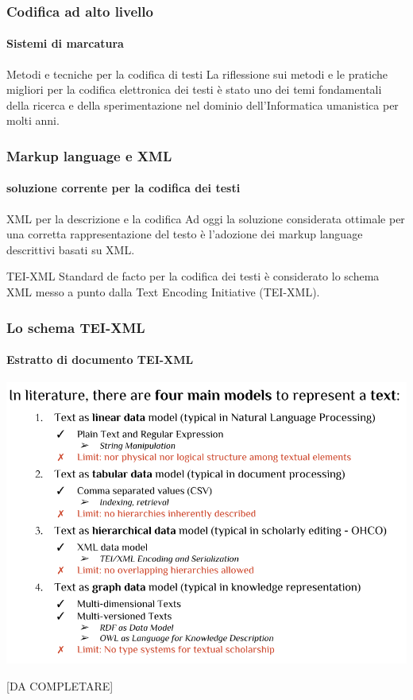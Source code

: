 \begin{frame}
	\frametitle{Codifica ad alto livello}
	\framesubtitle{Sistemi di marcatura}
	\addtocounter{nframe}{1}

	\begin{block}{Metodi e tecniche per la codifica di testi}
		La riflessione sui metodi e le pratiche migliori per la codifica elettronica dei testi è stato uno dei temi fondamentali della ricerca e della sperimentazione nel dominio dell’Informatica umanistica per molti anni.
	\end{block}

\end{frame}

\begin{frame}
	\frametitle{Markup language e XML}
	\framesubtitle{soluzione corrente per la codifica dei testi}
	\addtocounter{nframe}{1}

	\begin{block}{XML per la descrizione e la codifica}
		Ad oggi la soluzione considerata ottimale per una corretta rappresentazione del testo è l'adozione dei markup language descrittivi basati su XML.
	\end{block}

	\begin{block}{TEI-XML}
		Standard de facto per la codifica dei testi è considerato lo schema XML messo a punto dalla Text Encoding Initiative (TEI-XML).
	\end{block}

\end{frame}

\begin{frame}
	\frametitle{Lo schema TEI-XML}
	\framesubtitle{Estratto di documento TEI-XML}
	\addtocounter{nframe}{1}

	\begin{center}
		\includegraphics[width=.9\textwidth]{imgs/dataModels-slide.png}
	\end{center}

	[DA COMPLETARE]

	
\end{frame}

